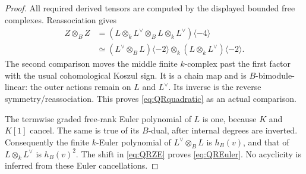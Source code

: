 \documentclass[11pt,a4paper]{article}
\theoremstyle{named}\newtheorem{finding}{Finding}[section]
\theoremstyle{definition}\newtheorem{definition}[finding]{Definition}
\theoremstyle{remark}\newtheorem{remark}[finding]{Remark}
\begin{document}
\begin{proof}
All required derived tensors are computed by the
displayed bounded free complexes. Reassociation gives
\[
\begin{split}
 Z\otimes_B Z
 &=(L\otimes_k L^\vee\otimes_B L\otimes_k L^\vee)
       \langle-4\rangle\\
 &\simeq (L^\vee\otimes_B L)\langle-2\rangle
       \otimes_k(L\otimes_k L^\vee)\langle-2\rangle.
\end{split}
\]
The second comparison moves the middle finite
\(k\)-complex past the first factor with the usual
cohomological Koszul sign. It is a chain map and
is \(B\)-bimodule-linear: the outer actions remain
on \(L\) and \(L^\vee\). Its inverse is the reverse
symmetry/reassociation. This proves
\eqref{eq:QRquadratic} as an actual comparison.

The termwise graded free-rank Euler polynomial of
\(L\) is one, because \(K\) and \(K[1]\) cancel.
The same is true of its \(B\)-dual, after internal
degrees are inverted. Consequently the finite
\(k\)-Euler polynomial of \(L^\vee\otimes_B L\)
is \(h_B(v)\), and that of \(L\otimes_k L^\vee\)
is \(h_B(v)^2\). The shift in \eqref{eq:QRZE}
proves \eqref{eq:QREuler}. No acyclicity is inferred
from these Euler cancellations.


\end{proof}
\end{document}
